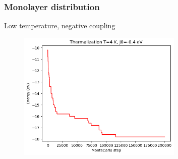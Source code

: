 \documentclass{beamer}
\begin{document}
\begin{frame}
    \frametitle{Monolayer distribution}

    \centering Low temperature, negative coupling

    \begin{figure}
        \includegraphics[width=0.7\textwidth]{images/erocco1.png}
    \end{figure}

\end{frame}
\end{document}
